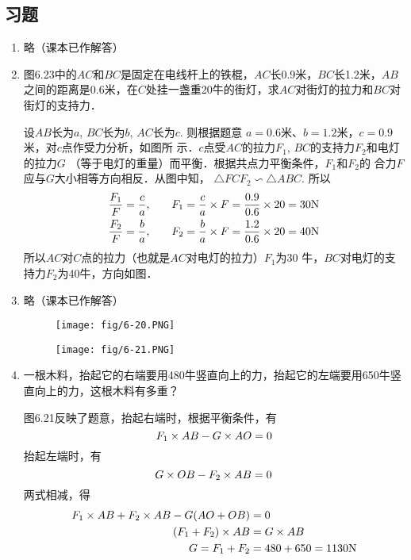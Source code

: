 \subsection{习题}
\begin{enumerate}
    \item 略（课本已作解答）

\item 图6.23中的$AC$和$BC$是固定在电线杆上的铁棍，$AC$长0.9米，$BC$长1.2米，$AB$之间的距离是0.6米，在$C$处挂一盏重20牛的街灯，求$AC$对街灯的拉力和$BC$对街灯的支持力．

\begin{solution}
    设$AB$长为$a$, $BC$长为$b$, $AC$长为$c$. 则根据题意
    $a=0.6$米、$b=1.2$米，$c=0.9$米，对$c$点作受力分析，如图所
    示．$c$点受$AC$的拉力$F_1$, $BC$的支持力$F_2$和电灯的拉力$G$
    （等于电灯的重量）而平衡．根据共点力平衡条件，$F_1$和$F_2$的
    合力$F$应与$G$大小相等方向相反．从图中知，
    $\triangle FCF_2\backsim\triangle ABC$. 所以
\[\begin{split}
    \frac{F_1}{F}=\frac{c}{a},&\qquad F_1=\frac{c}{a}\times F=\frac{0.9}{0.6}\times 20=30{\rm N}\\
    \frac{F_2}{F}=\frac{b}{a},&\qquad F_2=\frac{b}{a}\times F=\frac{1.2}{0.6}\times 20=40{\rm N}\\
\end{split}\]
    所以$AC$对$C$点的拉力（也就是$AC$对电灯的拉力）$F_1$为30
    牛，$BC$对电灯的支持力$F_2$为40牛，方向如图．
\end{solution}

\item 略（课本已作解答）

\begin{figure}[htp]
\centering
\begin{minipage}[t]{0.48\textwidth}
\centering
\texttt{[image: fig/6-20.PNG]}
\caption{}
\end{minipage}
\begin{minipage}[t]{0.48\textwidth}
\centering
\texttt{[image: fig/6-21.PNG]}
\caption{}
\end{minipage}
\end{figure}



\item 一根木料，抬起它的右端要用480牛竖直向上的力，抬起它的左端要用650牛竖直向上的力，这根木料有多重？

\begin{solution}
图6.21反映了题意，抬起右端时，根据平衡条件，有
\[F_1\times AB-G\times AO=0\]
抬起左端时，有
\[G\times OB-F_2\times AB=0\]
两式相减，得
\[\begin{split}
    F_1\times AB+F_2\times AB-G(AO+OB)&=0\\
(F_1+F_2)\times AB&=G\times AB\\
G=F_1+F_2&=480+650=1130{\rm N}
\end{split}\]


\end{solution}
\end{enumerate}

